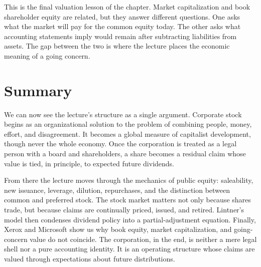 This is the final valuation lesson of the chapter. Market capitalization and book shareholder equity are related, but they answer different questions. One asks what the market will pay for the common equity today. The other asks what accounting statements imply would remain after subtracting liabilities from assets. The gap between the two is where the lecture places the economic meaning of a going concern.

\section{Summary}

We can now see the lecture's structure as a single argument. Corporate stock begins as an organizational solution to the problem of combining people, money, effort, and disagreement. It becomes a global measure of capitalist development, though never the whole economy. Once the corporation is treated as a legal person with a board and shareholders, a share becomes a residual claim whose value is tied, in principle, to expected future dividends.

From there the lecture moves through the mechanics of public equity: saleability, new issuance, leverage, dilution, repurchases, and the distinction between common and preferred stock. The stock market matters not only because shares trade, but because claims are continually priced, issued, and retired. Lintner's model then condenses dividend policy into a partial-adjustment equation. Finally, Xerox and Microsoft show us why book equity, market capitalization, and going-concern value do not coincide. The corporation, in the end, is neither a mere legal shell nor a pure accounting identity. It is an operating structure whose claims are valued through expectations about future distributions.